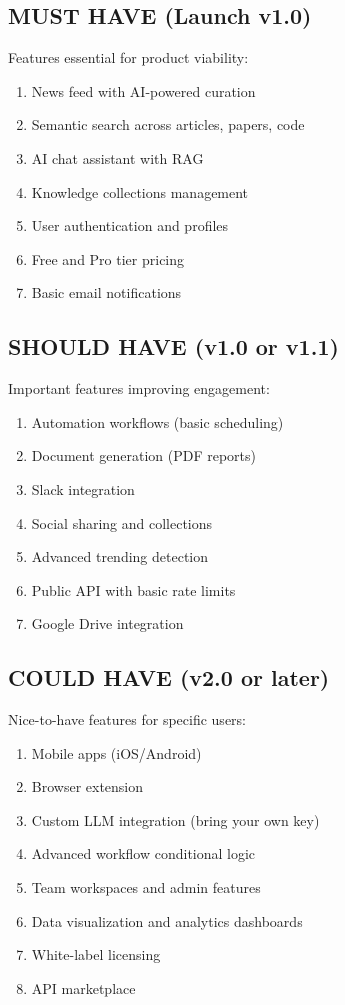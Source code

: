 \documentclass{report}
\begin{document}
\subsection{MUST HAVE (Launch v1.0)}

Features essential for product viability:

\begin{enumerate}
    \item News feed with AI-powered curation
    \item Semantic search across articles, papers, code
    \item AI chat assistant with RAG
    \item Knowledge collections management
    \item User authentication and profiles
    \item Free and Pro tier pricing
    \item Basic email notifications
\end{enumerate}

\subsection{SHOULD HAVE (v1.0 or v1.1)}

Important features improving engagement:

\begin{enumerate}
    \item Automation workflows (basic scheduling)
    \item Document generation (PDF reports)
    \item Slack integration
    \item Social sharing and collections
    \item Advanced trending detection
    \item Public API with basic rate limits
    \item Google Drive integration
\end{enumerate}

\subsection{COULD HAVE (v2.0 or later)}

Nice-to-have features for specific users:

\begin{enumerate}
    \item Mobile apps (iOS/Android)
    \item Browser extension
    \item Custom LLM integration (bring your own key)
    \item Advanced workflow conditional logic
    \item Team workspaces and admin features
    \item Data visualization and analytics dashboards
    \item White-label licensing
    \item API marketplace
\end{enumerate}
\end{document}
